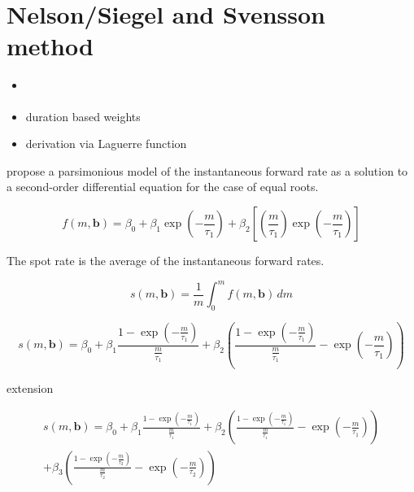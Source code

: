 \newpage
\section{Nelson/Siegel and Svensson method}
\label{sec:nels-svenss-meth}


\begin{itemize}
\item \cite{Geyer1999}
\item duration based weights \cite{Bliss1997}
\item derivation via Laguerre function
\end{itemize}


\cite{Nelson1987} propose a parsimonious  model of  the instantaneous forward rate as a solution to a second-order differential equation for the case of equal roots.

\begin{equation}
  \label{eq:laguerre}
  f(m,\bm{b}) = \beta_0+\beta_1\exp\left(-\frac{m}{\tau_1}\right)+\beta_2\left[\left(\frac{m}{\tau_1}\right)\exp\left(-\frac{m}{\tau_1}\right)\right]
\end{equation}


The spot rate is the average of the instantaneous forward rates. 

\begin{equation}
  \label{eq:intspotrate}
  s(m,\bm{b})=\frac{1}{m}\int_0^mf(m,\bm{b})\,dm
\end{equation}


\begin{equation}
  \label{eq:nelson-spot}
   s(m,\bm{b}) = \beta_0 + \beta_1\frac{1-\exp(-\frac{m}{\tau_1})}{\frac{m}{\tau_1}} + \beta_2\left(\frac{1-\exp(-\frac{m}{\tau_1})}{\frac{m}{\tau_1}} - \exp(-\frac{m}{\tau_1})\right)
\end{equation}



%
 
\cite{Svensson1994} extension


\begin{multline}\label{eq:svensson-spot}
    s(m,\bm{b}) = \beta_0 + \beta_1\frac{1-\exp(-\frac{m}{\tau_1})}{\frac{m}{\tau_1}} + \beta_2\left(\frac{1-\exp(-\frac{m}{\tau_1})}{\frac{m}{\tau_1}} - \exp(-\frac{m}{\tau_1})\right) \\+ \beta_3\left(\frac{1-\exp(-\frac{m}{\tau_2})}{\frac{m}{\tau_2}} - \exp(-\frac{m}{\tau_2})\right)
\end{multline}




